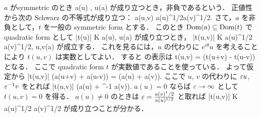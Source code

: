 $a$ がsymmetric のとき
\bdn %
a(u)
, \quad \forall u\in\Dom(a)
\edn %
が成り立つとき，非負であるという．
正値性 から次の Schwarz の不等式が成り立つ：
\bdn %
a(u,v)
\le a(u)^{1/2}a(v)^{1/2}.
\edn %
さて，$a$ を非負として，$t$ を一般の symmetric form とする．
このとき $\operatorname{Dom}\nolimits(a) \subseteq \operatorname{Dom}\nolimits(t) $ で quadratic form として
\bdm %
|t(u)| \le K a(u), \quad \forall u\in\Dom(a)
\edm %
が成り立つとき，
\bdm %
|t(u,v)| \le K a(u)^{1/2} a(v)^{1/2}, \quad \forall u,v\in\Dom(a)
\edm %
が成立する．
これを見るには，$u$ の代わりに $e^{i\theta}u$ を考えることにより
$t(u,v)$ は実数としてよい．
すると  の表示は
\bdm %
t(u,v)
= (t(u+v) - t(u-v))
\edm %
となる．
ここで quadratic form $t$ が実数値であることを使っている．
よって仮定から
\bdm %
|t(u,v)|
\le {}(a(u+v) + a(u-v))
=   (a(u) + a(v)).
\edm %
ここで $u$, $v$ の代わりに $\varepsilon u$, $\varepsilon^{-1}v$ をとれば
\bdm %
|t(u,v)|
\le {}(\e a(u) + \e^{-1} a(v)).
\edm %
$a(u)=0$ ならば $\varepsilon\to\infty$ として $t(u,v)=0$ を得る．
$a(u)\not=0$ のときは $\varepsilon=\frac{a(v)^1/2}{a(u)^{1/2}}$ と取れば
\bdm %
|t(u,v)|
\le K a(u)^{1/2} a(v)^{1/2}
\edm %
が成り立つことが分かる．

